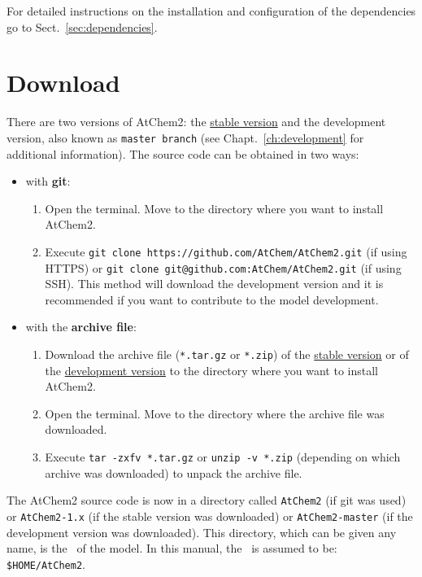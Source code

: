 For detailed instructions on the installation and configuration of the
dependencies go to Sect.~\ref{sec:dependencies}.

\section{Download} \label{sec:download}

There are two versions of AtChem2: the
\href{https://github.com/AtChem/AtChem2/releases}{stable version} and
the development version, also known as \texttt{master\ branch} (see
Chapt.~\ref{ch:development} for additional information). The source
code can be obtained in two ways:

\begin{itemize}
\item with \textbf{git}:
  \begin{enumerate}
  \item Open the terminal. Move to the directory where you want to
    install AtChem2.
  \item Execute \verb|git clone https://github.com/AtChem/AtChem2.git|
    (if using HTTPS) or \verb|git clone git@github.com:AtChem/AtChem2.git|
    (if using SSH). This method will download the development version
    and it is recommended if you want to contribute to the model
    development.
  \end{enumerate}
\item with the \textbf{archive file}:
  \begin{enumerate}
  \item Download the archive file (\texttt{*.tar.gz} or \texttt{*.zip}) of the
    \href{https://github.com/AtChem/AtChem2/releases}{stable version} or of the
    \href{https://github.com/AtChem/AtChem2/archive/master.zip}{development version}
    to the directory where you want to install AtChem2.
  \item Open the terminal. Move to the directory where the archive
    file was downloaded.
  \item Execute \verb|tar -zxfv *.tar.gz| or \verb|unzip -v *.zip|
    (depending on which archive was downloaded) to unpack the archive
    file.
  \end{enumerate}
\end{itemize}

The AtChem2 source code is now in a directory called \texttt{AtChem2}
(if git was used) or \texttt{AtChem2-1.x} (if the stable version was
downloaded) or \texttt{AtChem2-master} (if the development version was
downloaded). This directory, which can be given any name, is the
\maindir\ of the model. In this manual, the \maindir\ is assumed to
be: \texttt{\$HOME/AtChem2}.

